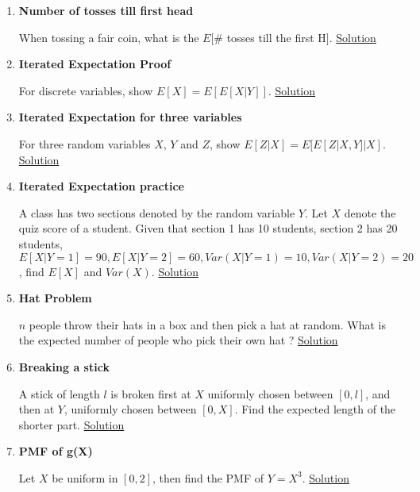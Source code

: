 \documentclass[11pt, a4paper]{article}
\begin{document}
\begin{enumerate}
    \item \hypertarget{q_tossh}{\textbf{Number of tosses till first head}}\newline
    When tossing a fair coin, what is the $E[$\# tosses till the first H$]$. \hyperlink{a_tossh}{Solution}
    
    \item \hypertarget{q_itrexpproof}{\textbf{Iterated Expectation Proof}}\newline
    For discrete variables, show $E[X] = E[E[X|Y]]$. \hyperlink{a_itrexpproof}{Solution}
    
    \item \hypertarget{q_itrexpthree}{\textbf{Iterated Expectation for three variables}}\newline
    For three random variables $X$, $Y$ and $Z$, show $E[Z|X] = E[E[Z|X,Y]|X]$. \hyperlink{a_itrexpthree}{Solution}
    
    \item \hypertarget{q_itrexppractice}{\textbf{Iterated Expectation practice}}\newline
    A class has two sections denoted by the random variable $Y$. Let $X$ denote the quiz score of a student. Given that section 1 has 10 students, section 2 has 20 students, $E[X|Y=1] = 90, E[X|Y=2] = 60, Var(X|Y=1) = 10, Var(X|Y=2) = 20$, find $E[X]$ and $Var(X)$. \hyperlink{a_itrexppractice}{Solution}

    \item \hypertarget{q_hatproblem}{\textbf{Hat Problem}}\newline
    $n$ people throw their hats in a box and then pick a hat at random. What is the expected number of people who pick their own hat ? \hyperlink{a_hatproblem}{Solution}
    
    \item \hypertarget{q_breakstick}{\textbf{Breaking a stick}}\newline
    A stick of length $l$ is broken first at $X$ uniformly chosen between $[0,l]$, and then at $Y$, uniformly chosen between $[0,X]$. Find the expected length of the shorter part. \hyperlink{a_breakstick}{Solution}
    
    \item \hypertarget{q_pmffn}{\textbf{PMF of g(X)}}\newline
    Let $X$ be uniform in $[0, 2]$, then find the PMF of $Y = X^{3}$. \hyperlink{a_pmffn}{Solution}


\end{enumerate}
\end{document}
